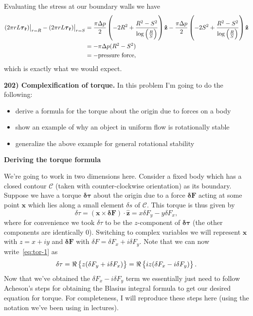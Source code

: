\documentclass{article}
\def\*#1{\mathbf{#1}}
\newcommand{\fC}{\mathcal{C}} %
\newcommand{\rhat}{\mathbf{\hat{r}}}
\newcommand{\zhat}{\mathbf{\hat{z}}}
\newcommand{\tauvec}{\boldsymbol{\tau}}
\newcommand{\dtauvec}{\boldsymbol{\delta \tau}}
\newcommand{\dFvec}{\boldsymbol{\delta} \mathbf{F}}
\newcommand{\dF}{\delta F}
\newcommand{\ds}{\delta s}
\newcommand{\dtau}{\delta \tau}
\begin{document}
%
Evaluating the stress at our boundary walls we have
%
\begin{align*}
    \eval[1]{\del{2 \pi r L \tauvec_\rhat}}_{r = R} - \eval[1]{\del{2 \pi r L \tauvec_\rhat}}_{r = S}
        &= \frac{\pi \Delta p}{2} \del{- 2 R^2 + \frac{R^2 - S^2}{\log\del{\frac{R}{S}}}} \zhat
           - \frac{\pi \Delta p}{2} \del{- 2 S^2 + \frac{R^2 - S^2}{\log\del{\frac{R}{S}}}} \zhat \\
        &= - \pi \Delta p (R^2 - S^2) \\
        &= - \text{pressure force}
        ,
\end{align*}
%
which is exactly what we would expect.

\newpage

\textbf{202) Complexification of torque.}
In this problem I'm going to do the following:
%
\begin{itemize}
    \item derive a formula for the torque about the origin due to forces on a body
    \item show an example of why an object in uniform flow is rotationally stable
    \item generalize the above example for general rotational stability
\end{itemize}

\textbf{Deriving the torque formula}

We're going to work in two dimensions here. Consider a fixed body which
has a closed contour $\fC$ (taken with counter-clockwise orientation) as
its boundary. Suppose we have a torque $\dtauvec$ about the origin due
to a force $\dFvec$ acting at some point $\*x$ which lies along a small
element $\ds$ of $\fC$. This torque is thus given by
%
\begin{equation}
    \dtau = (\*x \times \dFvec) \cdot \zhat = x \dF_y - y \dF_x
    \label{eq:tor-1}
    ,
\end{equation}
%
where for convenience we took $\dtau$ to be the $z$-component of
$\dtauvec$ (the other components are identically 0). Switching to complex
variables we will represent $\*x$ with $z = x + i y$ and $\dFvec$ with $\dF =
\dF_x + i \dF_y$. Note that we can now write~\eqref{eq:tor-1} as
%
\begin{equation}
    \dtau = \Re \cbr{z (\dF_y + i \dF_x)} = \Re \cbr{i z (\dF_x - i \dF_y)}
    \label{eq:tor-2}
    .
\end{equation}
%
Now that we've obtained the $\dF_x - i \dF_y$ term we essentially just
need to follow Acheson's steps for obtaining the Blasius integral
formula to get our desired equation for torque. For completeness, I will
reproduce these steps here (using the notation we've been using in
lectures).
\end{document}
